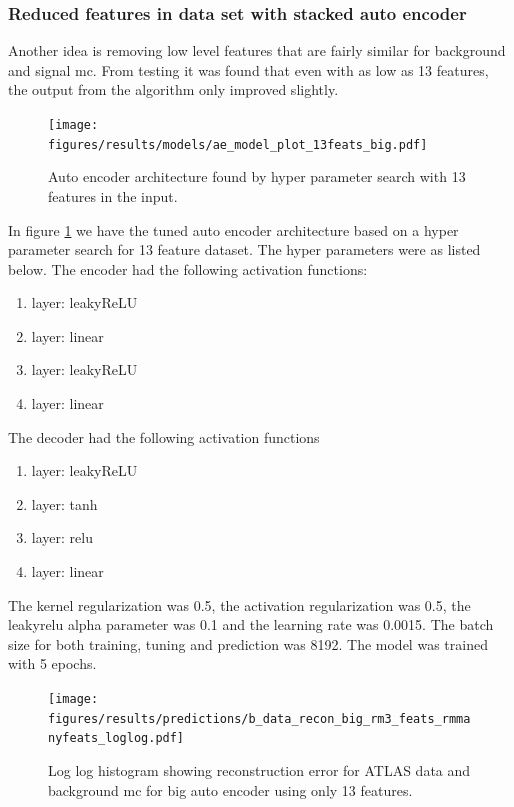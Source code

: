 \documentclass[ reprint, amsmath,amssymb, aps, nofootinbib]{revtex4-2}
\begin{document}
\subsubsection{Reduced features in data set with stacked auto encoder}

Another idea is removing low level features that are fairly similar for background and signal mc. From testing it was found that even with as low as 13 features, the output from the algorithm only improved slightly.



\begin{figure}[H]    
  \centering
         \texttt{[image: figures/results/models/ae\_model\_plot\_13feats\_big.pdf]}
         \caption{Auto encoder architecture found by hyper parameter search with 13 features in the input.}
         \label{fig:ae_13feats_big}  
  
\end{figure}


In figure \ref{fig:ae_13feats_big} we have the tuned auto encoder architecture based on a hyper parameter search for 13 feature dataset. The hyper parameters were as listed below. The encoder had the following activation functions:
\begin{enumerate}
  \item layer: leakyReLU
  \item layer: linear
  \item layer: leakyReLU
  \item layer: linear
\end{enumerate}

The decoder had the following activation functions
\begin{enumerate}
  \item layer: leakyReLU
  \item layer: tanh
  \item layer: relu
  \item layer: linear
\end{enumerate}
The kernel regularization was 0.5, the activation regularization was 0.5, the leakyrelu alpha parameter was 0.1 and the learning rate was 0.0015. The batch size for both training, tuning and prediction was 8192. The model was trained with 5 epochs.

\begin{figure}[H]
     \centering
         \texttt{[image: figures/results/predictions/b\_data\_recon\_big\_rm3\_feats\_rmmanyfeats\_loglog.pdf]}
         \caption{Log log histogram showing reconstruction error for ATLAS data and background mc for big auto encoder using only 13 features.}
     \label{fig:data_b_big_pred_13feats}
\end{figure}
\end{document}
